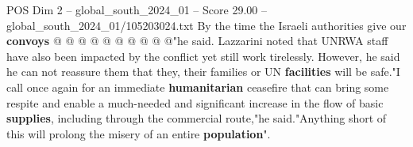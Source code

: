 \begin{textsample}{POS Dim 2 – global\_south\_2024\_01 – Score 29.00 – global\_south\_2024\_01/105203024.txt}
By the time the Israeli authorities give our \textbf{convoys} @ @ @ @ @ @ @ @ @ @"he said.
Lazzarini noted that UNRWA staff have also been impacted by the conflict yet still work tirelessly.
However, he said he can not reassure them that they, their families or UN \textbf{facilities} will be safe."I call once again for an immediate \textbf{humanitarian} ceasefire that can bring some respite and enable a much-needed and significant increase in the flow of basic \textbf{supplies}, including through the commercial route,"he said."Anything short of this will prolong the misery of an entire \textbf{population}".

\end{textsample}
